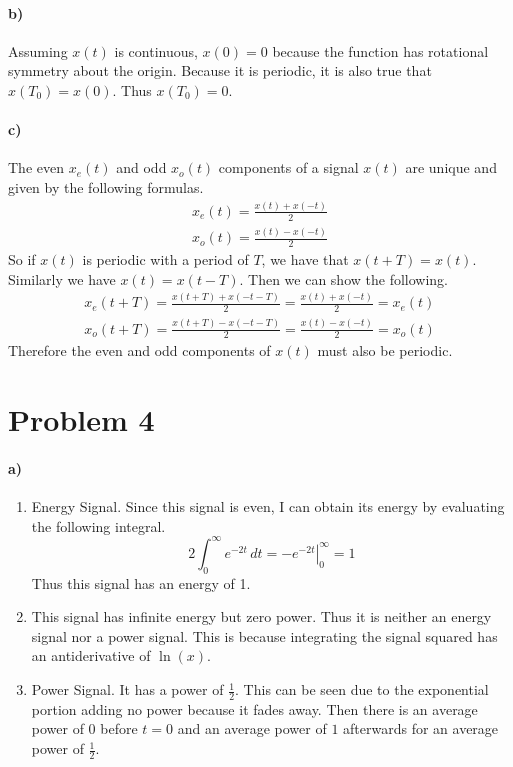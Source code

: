 \documentclass[12pt]{article}
\begin{document}
\paragraph{b)}

Assuming \(x(t)\) is continuous, \(x(0)=0\) because the function has rotational symmetry about the origin. Because it is periodic, it is also true that \(x(T_0)=x(0)\).
Thus \(x(T_0)=0\).

\paragraph{c)}

The even \(x_e(t)\) and odd \(x_o(t)\) components of a signal \(x(t)\) are unique and given by the following formulas.
\begin{gather*}
	x_e(t) = \frac{x(t)+x(-t)}{2}\\
	x_o(t) = \frac{x(t)-x(-t)}{2}
\end{gather*}
So if \(x(t)\) is periodic with a period of \(T\), we have that \(x(t+T)=x(t)\). Similarly we have \(x(t)=x(t-T)\). Then we can show the following.
\begin{gather*}
	x_e(t+T) = \frac{x(t+T)+x(-t-T)}{2} = \frac{x(t)+x(-t)}{2} = x_e(t)\\
	x_o(t+T) = \frac{x(t+T)-x(-t-T)}{2} = \frac{x(t)-x(-t)}{2} = x_o(t)
\end{gather*}
Therefore the even and odd components of \(x(t)\) must also be periodic.

\section*{Problem 4}

\paragraph{a)}

\begin{enumerate}
	\item Energy Signal. Since this signal is even, I can obtain its energy by evaluating the following integral.
	\[2\int_0^\infty e^{-2t}\,dt=\left.-e^{-2t}\right|_0^\infty=1\]
	Thus this signal has an energy of 1.
	\item This signal has infinite energy but zero power. Thus it is neither an energy signal nor a power signal. This is because integrating the
	signal squared has an antiderivative of \(\ln(x)\).
	\item Power Signal. It has a power of \(\frac{1}{2}\). This can be seen due to the exponential portion adding no power because it fades away. Then
	there is an average power of \(0\) before \(t=0\) and an average power of \(1\) afterwards for an average power of \(\frac{1}{2}\).
\end{enumerate}
\end{document}
